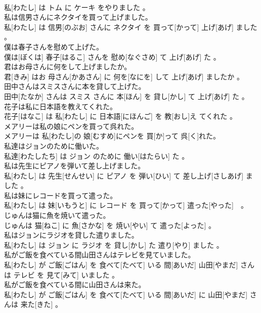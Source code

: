\documentclass[8pt]{extreport}
\begin{document}
\begin{CJK}{UTF8}{min}
\\	私[わたし] は トム に ケーキ をやりました 。
\\	私は信男さんにネクタイを買って上げました。	
\\	私[わたし] は 信男[のぶお] さんに ネクタイ を 買って[かって] 上げ[あげ] ました 。
\\	僕は春子さんを慰めて上げた。	
\\	僕は[ぼくは] 春子[はるこ] さんを 慰め[なぐさめ] て 上げ[あげ] た 。
\\	君はお母さんに何をして上げましたか。	
\\	君[きみ] はお 母さん[かあさん] に 何を[なにを] して 上げ[あげ] ましたか 。
\\	田中さんはスミスさんに本を貸して上げた。	
\\	田中[たなか] さんは スミス さんに 本[ほん] を 貸し[かし] て 上げ[あげ] た 。
\\	花子は私に日本語を教えてくれた。	
\\	花子[はなこ] は 私[わたし] に 日本語[にほんご] を 教[おし]え てくれた 。
\\	メアリーは私の娘にペンを買って呉れた。	
\\	メアリーは 私[わたし]の 娘[むすめ]にペンを 買[か]って 呉[く]れた。
\\	私達はジョンのために働いた。	
\\	私達[わたしたち] は ジョン のために 働い[はたらい] た 。
\\	私は先生にピアノを弾いて差し上げました。	
\\	私[わたし] は 先生[せんせい] に ピアノ を 弾い[ひい] て 差し上げ[さしあげ] ました 。
\\	私は妹にレコードを買って遣った。	
\\	私[わたし] は 妹[いもうと] に レコード を 買って[かって] 遣った[やった]　。
\\	じゅんは猫に魚を焼いて遣った。	
\\	じゅんは 猫[ねこ] に 魚[さかな] を 焼い[やい] て 遣った[よった] 。
\\	私はジョンにラジオを貸した遣りました。	
\\	私[わたし] は ジョン に ラジオ を 貸し[かし] た 遣り[やり] ました 。
\\	私がご飯を食べている間山田さんはテレビを見ていました。	
\\	私[わたし] が ご飯[ごはん] を 食べて[たべて] いる 間[あいだ] 山田[やまだ] さんは テレビ を 見て[みて] いました 。
\\	私がご飯を食べている間に山田さんは来た。	
\\	私[わたし] が ご飯[ごはん] を 食べて[たべて] いる 間[あいだ] に 山田[やまだ] さんは 来た[きた] 。

\end{CJK}
\end{document}
